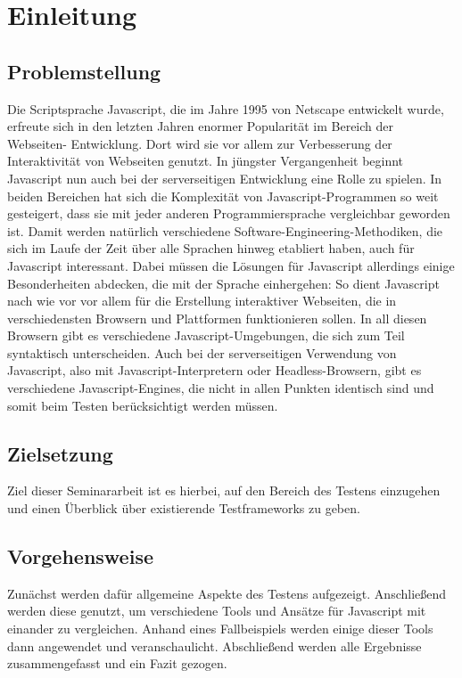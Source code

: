 \section{Einleitung}

\subsection{Problemstellung}
Die Scriptsprache Javascript, die im Jahre 1995 von Netscape entwickelt wurde, erfreute sich in den letzten Jahren enormer Popularität im Bereich der Webseiten- Entwicklung. Dort wird sie vor allem zur Verbesserung der Interaktivität von Webseiten genutzt. In jüngster Vergangenheit beginnt Javascript nun auch bei der serverseitigen Entwicklung eine Rolle zu spielen. In beiden Bereichen hat sich die Komplexität von Javascript-Programmen so weit gesteigert, dass sie mit jeder anderen Programmiersprache vergleichbar geworden ist. Damit werden natürlich verschiedene Software-Engineering-Methodiken, die sich im Laufe der Zeit über alle Sprachen hinweg etabliert haben, auch für Javascript interessant. Dabei müssen die Lösungen für Javascript allerdings einige Besonderheiten abdecken, die mit der Sprache einhergehen: So dient Javascript nach wie vor vor allem für die Erstellung interaktiver Webseiten, die in verschiedensten Browsern und Plattformen funktionieren sollen. In all diesen Browsern gibt es verschiedene Javascript-Umgebungen, die sich zum Teil syntaktisch unterscheiden. Auch bei der serverseitigen Verwendung von Javascript, also mit Javascript-Interpretern oder Headless-Browsern, gibt es verschiedene Javascript-Engines, die nicht in allen Punkten identisch sind und somit beim Testen berücksichtigt werden müssen.

\subsection{Zielsetzung}
Ziel dieser Seminararbeit ist es hierbei, auf den Bereich des Testens einzugehen und einen Überblick über existierende Testframeworks zu geben.

\subsection{Vorgehensweise}
Zunächst werden dafür allgemeine Aspekte des Testens aufgezeigt. Anschließend werden diese genutzt, um verschiedene Tools und Ansätze für Javascript mit einander zu vergleichen. Anhand eines Fallbeispiels werden einige dieser Tools dann angewendet und veranschaulicht. Abschließend werden alle Ergebnisse zusammengefasst und ein Fazit gezogen.


